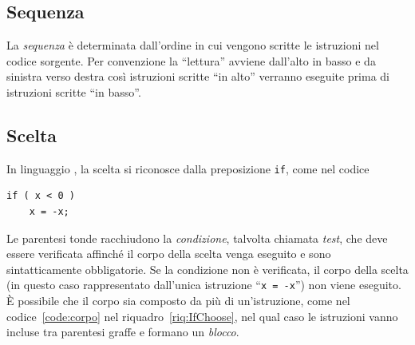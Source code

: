 		\subsection{Sequenza}

La \emph{sequenza} è determinata dall'ordine in cui vengono scritte le istruzioni nel codice sorgente.
Per convenzione la ``lettura'' avviene dall'alto in basso e da sinistra verso destra così istruzioni scritte ``in alto'' verranno eseguite prima di istruzioni scritte ``in basso''.

		\subsection{Scelta}
In linguaggio , la scelta si riconosce dalla preposizione \lstinline!if!, come nel codice

\begin{lstlisting}
if ( x < 0 )
	x = -x;
\end{lstlisting}
Le parentesi tonde racchiudono la \emph{condizione}, talvolta chiamata \emph{test}, che deve essere verificata affinché il corpo della scelta venga eseguito e sono sintatticamente obbligatorie.
Se la condizione non è verificata, il corpo della scelta (in questo caso rappresentato dall'unica istruzione ``\lstinline!x = -x!'') non viene eseguito.
\`E possibile che il corpo sia composto da più di un'istruzione, come nel codice~\ref{code:corpo} nel riquadro~\ref{riq:IfChoose}, nel qual caso le istruzioni vanno incluse tra parentesi graffe e formano un \emph{blocco}.

